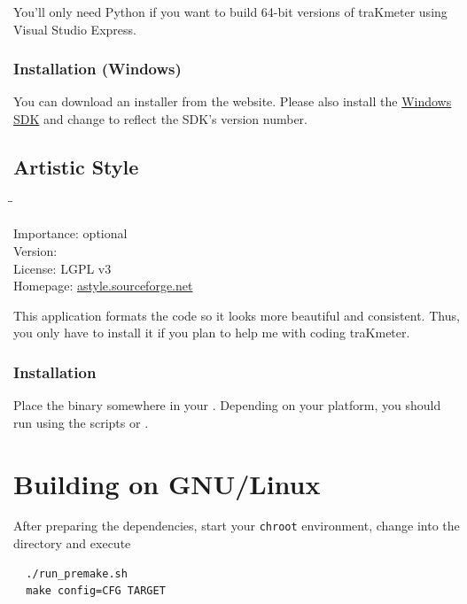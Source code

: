 You'll only need Python if you want to build \num{64}-bit versions of
traKmeter using Visual Studio Express.

\subsubsection{Installation (Windows)}

You can download an installer from the website.  Please also install
the \href{http://msdn.microsoft.com/windows/bb980924.aspx}{Windows
  SDK} and change  to reflect the SDK's version
number.

\subsection{Artistic Style}

\begin{tabbing}
  \hspace*{6em}\=\=\kill

  Importance:  \> optional \\
  Version:      \\
  License:     \> LGPL v3 \\
  Homepage:    \> \href{http://astyle.sourceforge.net/}{astyle.sourceforge.net}
\end{tabbing}

This application formats the code so it looks more beautiful and
consistent.  Thus, you only have to install it if you plan to help me
with coding traKmeter.

\subsubsection{Installation}

Place the binary somewhere in your .  Depending on your
platform, you should run  using the scripts
 or .

\section{Building on GNU/Linux}

After preparing the dependencies, start your \texttt{chroot}
environment, change into the directory  and execute

\begin{verbatim}
  ./run_premake.sh
  make config=CFG TARGET
\end{verbatim}

